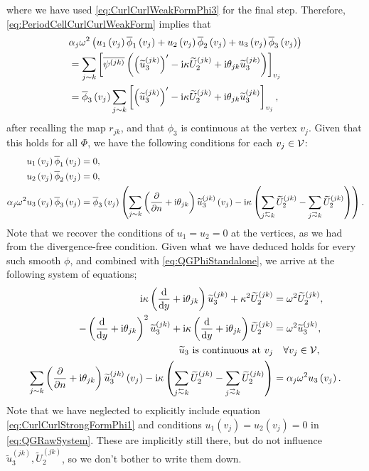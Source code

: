 \documentclass[11pt]{report}
\begin{document}
where we have used \eqref{eq:CurlCurlWeakFormPhi3} for the final step.
Therefore, \eqref{eq:PeriodCellCurlCurlWeakForm} implies that
\begin{align*}
	& \alpha_j \omega^2 \left(  u_1\left( v_j \right) \overline{\phi}_1\left( v_j \right) + u_2\left( v_j \right) \overline{\phi}_2\left( v_j \right) + u_3\left( v_j \right) \overline{\phi}_3\left( v_j \right)  \right) \\
	&= \sum_{j\sim k}\left[  \overline{\psi^{(jk)}}\left(  \left( \widetilde{u}_3^{(jk)} \right)' - \mathrm{i}\kappa\widetilde{U}_2^{(jk)} + \mathrm{i}\theta_{jk}\widetilde{u}_3^{(jk)}  \right)  \right]_{v_j} \\
	&= \overline{\phi}_3\left( v_j \right)\sum_{j\sim k}\left[  \left( \widetilde{u}_3^{(jk)} \right)' - \mathrm{i}\kappa\widetilde{U}_2^{(jk)} + \mathrm{i}\theta_{jk}\widetilde{u}_3^{(jk)}  \right]_{v_j},
\end{align*}
after recalling the map $r_{jk}$, and that $\phi_3$ is continuous at the vertex $v_j$.
Given that this holds for all $\Phi$, we have the following conditions for each $v_j\in\mathcal{V}$: 
\begin{align*}
	u_1\bracs{v_j}\overline{\phi}_1\bracs{v_j} &= 0, \\
	u_2\bracs{v_j}\overline{\phi}_2\bracs{v_j} &= 0, \\
	\alpha_j \omega^2 u_3\bracs{v_j} \overline{\phi}_3\bracs{v_j} 
	&= \overline{\phi}_3\bracs{v_j} \bracs{ \sum_{j\con k} \bracs{ \pdiff{}{n} + \rmi\qm_{jk} }\widetilde{u}_3^{(jk)}\bracs{v_j} - \rmi\wavenumber\bracs{ \sum_{j\conRight k} \widetilde{U}_2^{(jk)} - \sum_{j\conLeft k} \widetilde{U}_2^{(jk)} } }.
\end{align*}
Note that we recover the conditions of $u_1=u_2=0$ at the vertices, as we had from the divergence-free condition.
Given what we have deduced holds for every such smooth $\phi$, and combined with \eqref{eq:QGPhiStandalone}, we arrive at the following system of equations;
\begin{subequations} \label{eq:QGRawSystem}
	\begin{align}
		\rmi\wavenumber \bracs{ \diff{}{y} + \rmi\qm_{jk} }\widetilde{u}_3^{(jk)} + \wavenumber^2\widetilde{U}_2^{(jk)} &= \omega^2\widetilde{U}_2^{(jk)}, \label{eq:QGPhi2} \\
		-\bracs{ \diff{}{y} + \rmi\qm_{jk} }^2\widetilde{u}_3^{(jk)} + \rmi\wavenumber\bracs{ \diff{}{y} + \rmi\qm_{jk} }\widetilde{U}_2^{(jk)} &= \omega^2 \widetilde{u}_3^{(jk)}, \label{eq:QGPhi3} \\
		\widetilde{u}_3 \text{ is continuous at } v_j &\quad\forall v_j\in\vertSet, \label{eq:QGContinuity} \\
		\sum_{j\con k} \bracs{ \pdiff{}{n} + \rmi\qm_{jk} }\widetilde{u}_3^{(jk)}\bracs{v_j} - \rmi\wavenumber\bracs{ \sum_{j\conRight k} \widetilde{U}_2^{(jk)} - \sum_{j\conLeft k} \widetilde{U}_2^{(jk)} } 
		&= \alpha_j \omega^2 u_3\bracs{v_j}. \label{eq:QGVertexCondition}
	\end{align}
\end{subequations}
Note that we have neglected to explicitly include equation \eqref{eq:CurlCurlStrongFormPhi1} and conditions $u_1(v_j)=u_2(v_j)=0$ in \eqref{eq:QGRawSystem}.
These are implicitly still there, but do not influence $\widetilde{u}_3^{(jk)}, \widetilde{U}_2^{(jk)}$, so we don't bother to write them down.
\end{document}
